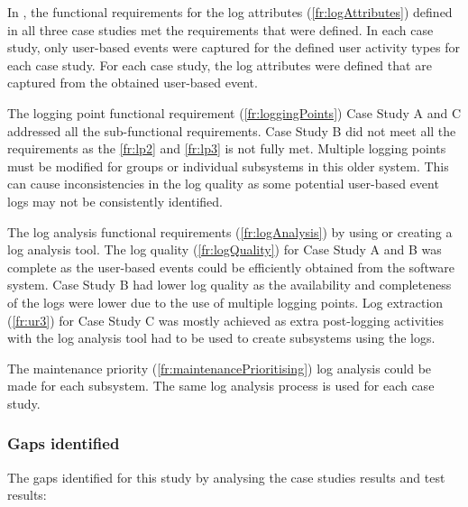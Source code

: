 In , the functional requirements for the log attributes (\ref{fr:logAttributes}) defined in  all three case studies met the requirements that were defined. In each case study, only user-based events were captured for the defined user activity types for each case study. For each case study, the log attributes were defined that are captured from the obtained user-based event.\par The logging point functional requirement (\ref{fr:loggingPoints}) Case Study A and C addressed all the sub-functional requirements. Case Study B did not meet all the requirements as the \ref{fr:lp2} and \ref{fr:lp3} is not fully met. Multiple logging points must be modified for groups or individual subsystems in this older system. This can cause inconsistencies in the log quality as some potential user-based event logs may not be consistently identified.\par The log analysis functional requirements (\ref{fr:logAnalysis}) by using or creating a log analysis tool. The log quality (\ref{fr:logQuality}) for Case Study A and B was complete as the user-based events could be efficiently obtained from the software system. Case Study B had lower log quality as the availability and completeness of the logs were lower due to the use of multiple logging points. Log extraction (\ref{fr:ur3}) for Case Study C was mostly achieved as extra post-logging activities with the log analysis tool had to be used to create subsystems using the logs.\par The maintenance priority (\ref{fr:maintenancePrioritising}) log analysis could be made for each subsystem. The same log analysis process is used for each case study.

\subsubsection{Gaps identified}
The gaps identified for this study by analysing the case studies results and test results:

